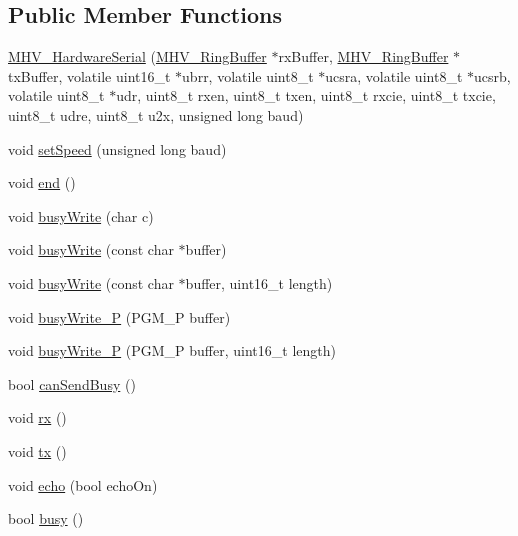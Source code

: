 \subsection*{\-Public \-Member \-Functions}
\begin{DoxyCompactItemize}
\item 
\hyperlink{class_m_h_v___hardware_serial_ac1a95bdefa81bae650979c7053901133}{\-M\-H\-V\-\_\-\-Hardware\-Serial} (\hyperlink{class_m_h_v___ring_buffer}{\-M\-H\-V\-\_\-\-Ring\-Buffer} $\ast$rx\-Buffer, \hyperlink{class_m_h_v___ring_buffer}{\-M\-H\-V\-\_\-\-Ring\-Buffer} $\ast$tx\-Buffer, volatile uint16\-\_\-t $\ast$ubrr, volatile uint8\-\_\-t $\ast$ucsra, volatile uint8\-\_\-t $\ast$ucsrb, volatile uint8\-\_\-t $\ast$udr, uint8\-\_\-t rxen, uint8\-\_\-t txen, uint8\-\_\-t rxcie, uint8\-\_\-t txcie, uint8\-\_\-t udre, uint8\-\_\-t u2x, unsigned long baud)
\item 
void \hyperlink{class_m_h_v___hardware_serial_af8d170e311447db775b308a3ba882b91}{set\-Speed} (unsigned long baud)
\item 
void \hyperlink{class_m_h_v___hardware_serial_a1cc98a306711c95770df293def48dd9b}{end} ()
\item 
void \hyperlink{class_m_h_v___hardware_serial_aa4c2fa65afae88e4d3854a35955705ee}{busy\-Write} (char c)
\item 
void \hyperlink{class_m_h_v___hardware_serial_acc533901bc41d333e48a93b75bf9a15d}{busy\-Write} (const char $\ast$buffer)
\item 
void \hyperlink{class_m_h_v___hardware_serial_aca9542f5ed2b7ba04f5398fccf8da262}{busy\-Write} (const char $\ast$buffer, uint16\-\_\-t length)
\item 
void \hyperlink{class_m_h_v___hardware_serial_aef0e7d7d7866c39a1cd5d2ef8c9bdbd2}{busy\-Write\-\_\-\-P} (\-P\-G\-M\-\_\-\-P buffer)
\item 
void \hyperlink{class_m_h_v___hardware_serial_a6a2371b9509e27893a6c238fc9a046a8}{busy\-Write\-\_\-\-P} (\-P\-G\-M\-\_\-\-P buffer, uint16\-\_\-t length)
\item 
bool \hyperlink{class_m_h_v___hardware_serial_a650ce0799c3dbefb7170fc1875449e5a}{can\-Send\-Busy} ()
\item 
void \hyperlink{class_m_h_v___hardware_serial_aab993847fb6369e666495000d94196a3}{rx} ()
\item 
void \hyperlink{class_m_h_v___hardware_serial_a3674578dc6dce3ca7d32d6f3df9cd49f}{tx} ()
\item 
void \hyperlink{class_m_h_v___hardware_serial_a815b6e92f32457c55c2808701f315ff2}{echo} (bool echo\-On)
\item 
bool \hyperlink{class_m_h_v___hardware_serial_a8ea82d7e9d6958604ff94a55f331e9d5}{busy} ()
\end{DoxyCompactItemize}
